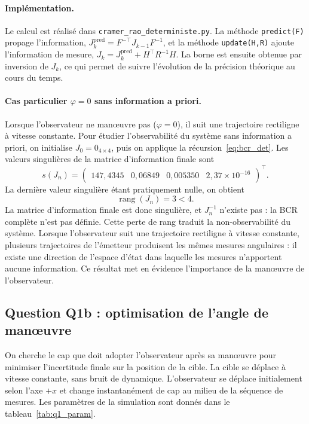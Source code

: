 \documentclass[11pt,a4paper]{article}
\theoremstyle{remark}
\begin{document}
\paragraph{Implémentation.}
Le calcul est réalisé dans \texttt{cramer\_rao\_deterministe.py}. La méthode \texttt{predict(F)} propage l'information, $J_k^{\mathrm{pred}} = F^{-\top} J_{k-1} F^{-1}$, et la méthode \texttt{update(H,R)} ajoute l'information de mesure, $J_k = J_k^{\mathrm{pred}} + H^\top R^{-1} H$. La borne est ensuite obtenue par inversion de $J_k$, ce qui permet de suivre l'évolution de la précision théorique au cours du temps.

\paragraph{Cas particulier $\varphi = 0$ sans information a priori.}
Lorsque l'observateur ne manœuvre pas ($\varphi = 0$), il suit une trajectoire rectiligne à vitesse constante. Pour étudier l'observabilité du système sans information a priori, on initialise $J_0 = 0_{4\times4}$, puis on applique la récursion~\eqref{eq:bcr_det}. Les valeurs singulières de la matrice d'information finale sont
\begin{equation}
s(J_n) = \begin{pmatrix} 147{,}4345 & 0{,}06849 & 0{,}005350 & 2{,}37\times10^{-16} \end{pmatrix}^{\top}.
\end{equation}
La dernière valeur singulière étant pratiquement nulle, on obtient
\begin{equation}
\boxed{\;\operatorname{rang}(J_n) = 3 < 4.\;}
\end{equation}
La matrice d'information finale est donc singulière, et $J_n^{-1}$ n'existe pas : la BCR complète n'est pas définie. Cette perte de rang traduit la non-observabilité du système. Lorsque l'observateur suit une trajectoire rectiligne à vitesse constante, plusieurs trajectoires de l'émetteur produisent les mêmes mesures angulaires : il existe une direction de l'espace d'état dans laquelle les mesures n'apportent aucune information. Ce résultat met en évidence l'importance de la manœuvre de l'observateur.

\subsection{Question Q1b : optimisation de l'angle de manœuvre}

On cherche le cap que doit adopter l'observateur après sa manœuvre pour minimiser l'incertitude finale sur la position de la cible. La cible se déplace à vitesse constante, sans bruit de dynamique. L'observateur se déplace initialement selon l'axe $+x$ et change instantanément de cap au milieu de la séquence de mesures. Les paramètres de la simulation sont donnés dans le tableau~\ref{tab:q1_param}.
\end{document}

